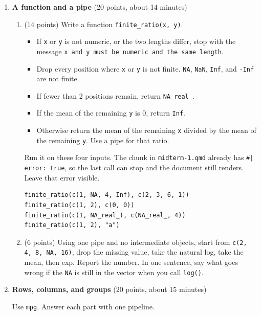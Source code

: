 \documentclass[11pt]{article}
\begin{document}
\begin{enumerate}

\item \textbf{A function and a pipe} (20 points, about 14 minutes)

\begin{enumerate}[label=\alph*., leftmargin=1.7em, itemsep=0.55em]
  \item (14 points) Write a function \texttt{finite\_ratio(x, y)}.
  \begin{itemize}
    \item If \texttt{x} or \texttt{y} is not numeric, or the two lengths differ, stop with the message \texttt{x and y must be numeric and the same length}.
    \item Drop every position where \texttt{x} or \texttt{y} is not finite. \texttt{NA}, \texttt{NaN}, \texttt{Inf}, and \texttt{-Inf} are not finite.
    \item If fewer than 2 positions remain, return \texttt{NA\_real\_}.
    \item If the mean of the remaining \texttt{y} is 0, return \texttt{Inf}.
    \item Otherwise return the mean of the remaining \texttt{x} divided by the mean of the remaining \texttt{y}. Use a pipe for that ratio.
  \end{itemize}
  Run it on these four inputs. The chunk in \texttt{midterm-1.qmd} already has \texttt{\#| error: true}, so the last call can stop and the document still renders. Leave that error visible.
\begin{lstlisting}
finite_ratio(c(1, NA, 4, Inf), c(2, 3, 6, 1))
finite_ratio(c(1, 2), c(0, 0))
finite_ratio(c(1, NA_real_), c(NA_real_, 4))
finite_ratio(c(1, 2), "a")
\end{lstlisting}

  \item (6 points) Using one pipe and no intermediate objects, start from \texttt{c(2, 4, 8, NA, 16)}, drop the missing value, take the natural log, take the mean, then exp. Report the number. In one sentence, say what goes wrong if the \texttt{NA} is still in the vector when you call \texttt{log()}.
\end{enumerate}

\item \textbf{Rows, columns, and groups} (20 points, about 15 minutes)

Use \texttt{mpg}. Answer each part with one pipeline.


\end{enumerate}
\end{document}
